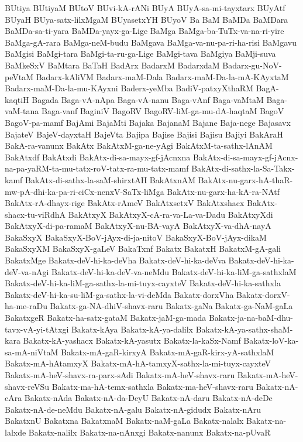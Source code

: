 {BUtiya
BUtiyaM
BUtoV
BUvi-kA-rANi
BUyA
BUyA-sa-mi-tayxtarx
BUyAtf
BUyaH
BUya-satx-lilxMgaM
BUyasetxYH
BUyoV
Ba
BaM
BaMDa
BaMDara
BaMDa-sa-ti-yara
BaMDa-yayx-ga-Lige
BaMga
BaMga-ba-TuTx-va-na-ri-yire
BaMga-gA-rara
BaMga-neM-budu
BaMgava
BaMga-va-nu-pa-ri-ha-risi
BaMgavu
BaMgisi
BaMgi-tara
BaMgi-ta-ru-ga-Lige
BaMgi-tava
BaMgiya
BaMji-suva
BaMkeSxV
BaMtara
BaTaH
BadArx
BadarxM
BadarxdaM
Badarx-gu-NoV-peVtaM
Badarx-kAliVM
Badarx-maM-Dala
Badarx-maM-Da-la-mA-KAyxtaM
Badarx-maM-Da-la-mu-KAyxni
Baderx-yeMba
BadiV-patxyXthaRM
BagA-kaqtiH
Bagada
Baga-vA-nApa
Baga-vA-nanu
Baga-vAnf
Baga-vaMtaM
Baga-vaM-tana
Baga-vanf
BaginiV
BagoRV
BagoRV-liM-ga-mu-dA-haqtaM
BagoV
BagoV-pa-mamf
BajAmi
BajaMti
Bajaka
BajanaM
Bajane
Baja-nege
Bajasavx
BajateV
BajeV-dayxtaH
BajeVta
Bajipa
Bajise
Bajisi
Bajisu
Bajiyi
BakAraH
BakA-ra-vanunx
BakAtx
BakAtxM-ga-ne-yAgi
BakAtxM-ta-sathx-lAnAM
BakAtxdf
BakAtxdi
BakAtx-di-sa-mayx-gf-jAcnxna
BakAtx-di-sa-mayx-gf-jAcnx-na-pa-yaRM-ta-mu-tatx-roV-tatx-ra-mu-tatx-mamf
BakAtx-di-sathx-la-Sa-Takx-kamf
BakAtx-di-sathx-la-saM-shirxtAH
BakAtxnAM
BakAtx-nu-garx-hA-thaR-mw-pA-dhi-ka-pa-ri-ciCx-nenxV-SaTx-liMga
BakAtx-nu-garx-ha-kA-ra-NAtf
BakAtx-rA-dhayx-rige
BakAtx-rAmeV
BakAtxsetxV
BakAtxshacx
BakAtx-shacx-tu-viRdhA
BakAtxyX
BakAtxyX-cA-ra-va-La-va-Dadu
BakAtxyXdi
BakAtxyX-di-pa-ramaM
BakAtxyX-nu-BA-vayA
BakAtxyX-va-dhA-nayA
BakaSxyX
BakaSxyX-BoV-jAyx-di-ja-nitoV
BakaSxyX-BoV-jAyx-dikaM
BakaSxyXM
BakaSxyX-gaLeV
BakaTxnf
Bakatx
BakatxH
BakatxM-gA-gali
BakatxMge
Bakatx-deV-hi-ka-deVha
Bakatx-deV-hi-ka-deVva
Bakatx-deV-hi-ka-deV-va-nAgi
Bakatx-deV-hi-ka-deV-va-neMdu
Bakatx-deV-hi-ka-liM-ga-sathxlaM
Bakatx-deV-hi-ka-liM-ga-sathx-la-mi-tuyx-cayxteV
Bakatx-deV-hi-ka-sathxla
Bakatx-deV-hi-ka-su-liM-ga-sathx-la-vi-deMda
Bakatx-dorxVha
Bakatx-dorxV-ha-me-raDu
Bakatx-ga-NA-dhiV-shavx-raru
Bakatx-gaNa
Bakatx-ga-NaM-gaLa
BakatxgeR
Bakatx-ha-satx-gataM
Bakatx-jaM-ga-mada
Bakatx-ja-na-baM-dhu-tavx-vA-yi-tAtxgi
Bakatx-kAya
Bakatx-kA-ya-dalilx
Bakatx-kA-ya-sathx-shaM-kara
Bakatx-kA-yashacx
Bakatx-kA-yasutx
Bakatx-la-kaSx-Namf
Bakatx-loV-ka-sa-mA-niVtaM
Bakatx-mA-gaR-kirxyA
Bakatx-mA-gaR-kirx-yA-sathxlaM
Bakatx-mA-hAtamxyX
Bakatx-mA-hA-tamxyX-sathx-la-mi-tuyx-cayxteV
Bakatx-mA-heV-shavx-ra-parx-sAdi
Bakatx-mA-heV-shavx-raru
Bakatx-mA-heV-shavx-reVSu
Bakatx-ma-hA-temx-sathxla
Bakatx-ma-heV-shavx-raru
Bakatx-nA-cAra
Bakatx-nAda
Bakatx-nA-da-DeyU
Bakatx-nA-daru
Bakatx-nA-deDe
Bakatx-nA-de-neMdu
Bakatx-nA-galu
Bakatx-nA-gidudx
Bakatx-nAru
BakatxnU
Bakatxna
BakatxnaM
Bakatx-naM-gaLa
Bakatx-nalalx
Bakatx-na-lalxde
Bakatx-nalilx
Bakatx-na-nAnxgi
Bakatx-nanunx
Bakatx-na-pUvaR
}
